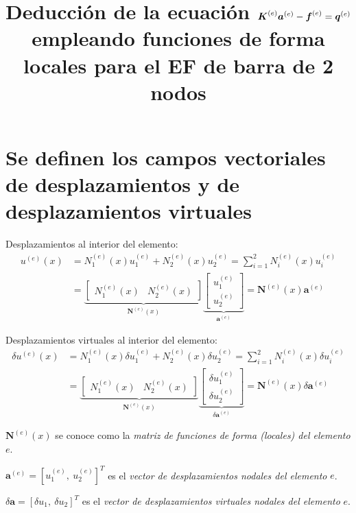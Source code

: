 \documentclass[12pt,landscape,letterpaper]{article}
\title{Deducción de la ecuación $\ma{K}^{(e)} \ve{a}^{(e)} - \ma{f}^{(e)} = \ma{q}^{(e)}$ empleando funciones de forma locales para el EF de barra de 2 nodos}
\date{}
\newcommand{\ve}[1]{{\boldsymbol{#1}}}
\newcommand{\ma}[1]{{\boldsymbol{#1}}}
\begin{document}
\maketitle
\vspace{-3cm}

\section{Se definen los campos vectoriales de desplazamientos y  de desplazamientos virtuales}

Desplazamientos al interior del elemento:
\begin{align}
u^{(e)}(x) 
&= N_1^{(e)}(x) u_1^{(e)} + N_2^{(e)}(x) u_2^{(e)} 
= \sum_{i=1}^2 N_i^{(e)}(x) u_i^{(e)} \\
&= 
\underbrace{\begin{bmatrix}
N_1^{(e)}(x) & N_2^{(e)}(x)
\end{bmatrix}}_{\ma{N}^{(e)}(x)}
\underbrace{\begin{bmatrix}
   u_1^{(e)} \\ u_2^{(e)}
   \end{bmatrix}}_{\ma{a}^{(e)}} = \ma{N}^{(e)}(x)  \ve{a}^{(e)}
\end{align}

Desplazamientos virtuales al interior del elemento:
\begin{align}
\delta u^{(e)}(x) 
&= N_1^{(e)}(x) \delta u_1^{(e)} + N_2^{(e)}(x) \delta u_2^{(e)} = \sum_{i=1}^2 N_i^{(e)}(x) \delta u_i^{(e)} \\
&= 
\underbrace{\begin{bmatrix}
   N_1^{(e)}(x) & N_2^{(e)}(x)
   \end{bmatrix}}_{\ma{N}^{(e)}(x)}
\underbrace{\begin{bmatrix}
   \delta u_1^{(e)} \\ \delta u_2^{(e)}
   \end{bmatrix}}_{\delta \ma{a}^{(e)}} = \ma{N}^{(e)}(x) \delta \ve{a}^{(e)}
\end{align}

$\ma{N}^{(e)}(x)$ se conoce como la \emph{matriz de funciones de forma (locales) del elemento} $e$.

$\ve{a}^{(e)} = [u_1^{(e)},\ u_2^{(e)}]^T$ es el \emph{vector de desplazamientos nodales del elemento} $e$.

$\delta\ve{a} = [\delta u_1,\ \delta u_2]^T$ es el \emph{vector de desplazamientos virtuales nodales del elemento} $e$.

\newpage
\end{document}
